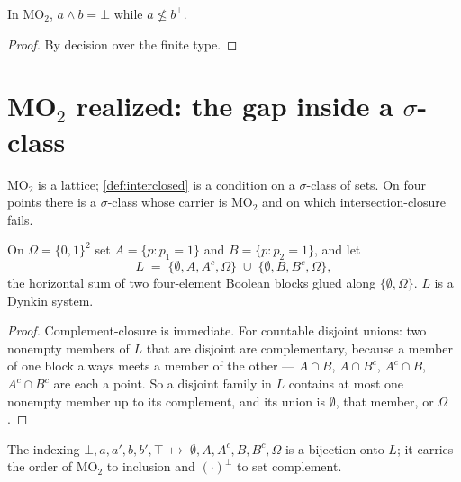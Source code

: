 \begin{theorem}
  \label{thm:mo2-gap}
  \leanok
  In MO$_2$, $a \wedge b = \bot$ while $a \not\le b^{\perp}$.
\end{theorem}

\begin{proof}
  \leanok
  By decision over the finite type.
\end{proof}

\section{MO$_2$ realized: the gap inside a $\sigma$-class}

MO$_2$ is a lattice; \ref{def:interclosed} is a condition on a $\sigma$-class of
sets. On four points there is a $\sigma$-class whose carrier is MO$_2$ and on
which intersection-closure fails.

\begin{definition}
  \label{def:concrete-mo2}
  \leanok
  On $\Omega = \{0,1\}^{2}$ set $A = \{p : p_1 = 1\}$ and $B = \{p : p_2 = 1\}$,
  and let
  \[
    L \;=\; \{\emptyset, A, A^{c}, \Omega\} \;\cup\;
            \{\emptyset, B, B^{c}, \Omega\},
  \]
  the horizontal sum of two four-element Boolean blocks glued along
  $\{\emptyset, \Omega\}$. $L$ is a Dynkin system.
\end{definition}

\begin{proof}
  \leanok
  Complement-closure is immediate. For countable disjoint unions: two nonempty
  members of $L$ that are disjoint are complementary, because a member of one
  block always meets a member of the other --- $A \cap B$, $A \cap B^{c}$,
  $A^{c} \cap B$, $A^{c} \cap B^{c}$ are each a point. So a disjoint family in
  $L$ contains at most one nonempty member up to its complement, and its union
  is $\emptyset$, that member, or $\Omega$.
\end{proof}

\begin{theorem}
  \label{thm:concrete-mo2-iso}
  \leanok
  The indexing
  $\bot, a, a', b, b', \top \;\mapsto\; \emptyset, A, A^{c}, B, B^{c}, \Omega$
  is a bijection onto $L$; it carries the order of MO$_2$ to inclusion and
  $(\cdot)^{\perp}$ to set complement.
\end{theorem}

